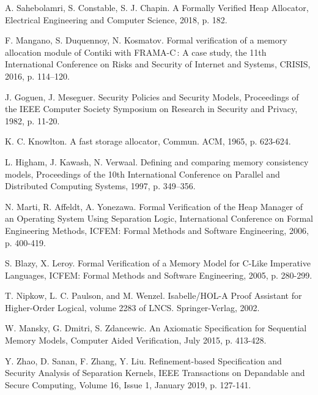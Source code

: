 \documentclass[runningheads]{llncs}
\begin{document}
\begin{thebibliography}{8}
A. Sahebolamri, S. Constable, S. J. Chapin. A Formally Verified Heap Allocator, Electrical Engineering and Computer Science, 2018, p. 182.
	
F. Mangano, S. Duquennoy, N. Kosmatov. Formal verification of a memory allocation module of Contiki with FRAMA-C : A case study, the 11th International Conference on Risks and Security of Internet and Systems, CRISIS, 2016, p. 114–120.

J. Goguen, J. Meseguer. Security Policies and Security Models, Proceedings of the IEEE Computer Society Symposium on Research in Security and Privacy, 1982, p. 11-20.

K. C. Knowlton. A fast storage allocator, Commun. ACM, 1965, p. 623-624.

L. Higham, J. Kawash, N. Verwaal. Defining and comparing memory consistency
models, Proceedings of the 10th International Conference on Parallel and Distributed Computing Systems, 1997, p. 349–356.

N. Marti, R. Affeldt, A. Yonezawa. Formal Verification of the Heap Manager of an Operating System Using Separation Logic, International Conference on Formal Engineering Methods, ICFEM: Formal Methods and Software Engineering, 2006, p. 400-419.

S. Blazy, X. Leroy. Formal Verification of a Memory Model for C-Like Imperative Languages, ICFEM: Formal Methods and Software Engineering, 2005, p. 280-299.

T. Nipkow, L. C. Paulson, and M. Wenzel. Isabelle/HOL-A Proof Assistant for Higher-Order Logical, volume 2283 of LNCS. Springer-Verlag, 2002.

W. Mansky, G. Dmitri, S. Zdancewic. An Axiomatic Specification for Sequential Memory Models, Computer Aided Verification, July 2015, p. 413-428.

Y. Zhao, D. Sanan, F. Zhang, Y. Liu. Refinement-based Specification and Security Analysis of Separation Kernels, IEEE Transactions on Depandable and Secure Computing, Volume 16, Issue 1, January 2019, p. 127-141.
\end{thebibliography}
\end{document}
